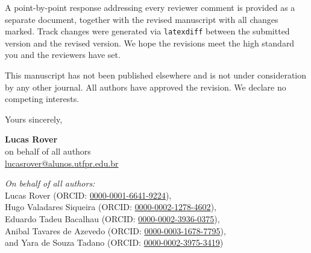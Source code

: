 \documentclass[11pt,a4paper]{article}
\begin{document}
A point-by-point response addressing every reviewer comment is provided as a separate document, together with the revised manuscript with all changes marked. Track changes were generated via \texttt{latexdiff} between the submitted version and the revised version. We hope the revisions meet the high standard you and the reviewers have set.

This manuscript has not been published elsewhere and is not under consideration by any other journal. All authors have approved the revision. We declare no competing interests.

\bigskip

\noindent Yours sincerely,

\bigskip\bigskip

\noindent \textbf{Lucas Rover}\\
on behalf of all authors\\
\href{mailto:lucasrover@alunos.utfpr.edu.br}{lucasrover@alunos.utfpr.edu.br}\\

\bigskip

\noindent \textit{On behalf of all authors:}\\
Lucas Rover (ORCID: \href{https://orcid.org/0000-0001-6641-9224}{0000-0001-6641-9224}),\\
Hugo Valadares Siqueira (ORCID: \href{https://orcid.org/0000-0002-1278-4602}{0000-0002-1278-4602}),\\
Eduardo Tadeu Bacalhau (ORCID: \href{https://orcid.org/0000-0002-3936-0375}{0000-0002-3936-0375}),\\
Anibal Tavares de Azevedo (ORCID: \href{https://orcid.org/0000-0003-1678-7795}{0000-0003-1678-7795}),\\
and Yara de Souza Tadano (ORCID: \href{https://orcid.org/0000-0002-3975-3419}{0000-0002-3975-3419})
\end{document}
